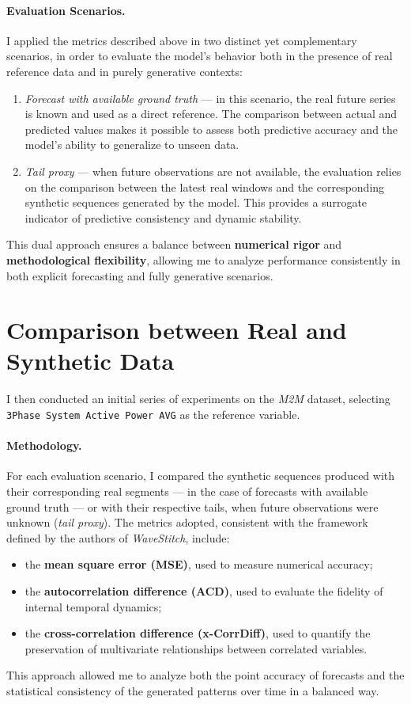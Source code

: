 \paragraph{Evaluation Scenarios.}
I applied the metrics described above in two distinct yet complementary scenarios, in order to evaluate the model’s behavior both in the presence of real reference data and in purely generative contexts:

\begin{enumerate}
  \item \emph{Forecast with available ground truth} — in this scenario, the real future series is known and used as a direct reference. The comparison between actual and predicted values makes it possible to assess both predictive accuracy and the model’s ability to generalize to unseen data.
  
  \item \emph{Tail proxy} — when future observations are not available, the evaluation relies on the comparison between the latest real windows and the corresponding synthetic sequences generated by the model. This provides a surrogate indicator of predictive consistency and dynamic stability.
\end{enumerate}

This dual approach ensures a balance between \textbf{numerical rigor} and \textbf{methodological flexibility}, allowing me to analyze performance consistently in both explicit forecasting and fully generative scenarios.


\section{Comparison between Real and Synthetic Data}

I then conducted an initial series of experiments on the \emph{M2M} dataset, selecting \texttt{3Phase System Active Power AVG} as the reference variable.

\paragraph{Methodology.}
For each evaluation scenario, I compared the synthetic sequences produced with their corresponding real segments — in the case of forecasts with available ground truth — or with their respective tails, when future observations were unknown (\emph{tail proxy}).  
The metrics adopted, consistent with the framework defined by the authors of \emph{WaveStitch}, include:
\begin{itemize}
  \item the \textbf{mean square error (MSE)}, used to measure numerical accuracy;
  \item the \textbf{autocorrelation difference (ACD)}, used to evaluate the fidelity of internal temporal dynamics;
  \item the \textbf{cross-correlation difference (x-CorrDiff)}, used to quantify the preservation of multivariate relationships between correlated variables.
\end{itemize}
This approach allowed me to analyze both the point accuracy of forecasts and the statistical consistency of the generated patterns over time in a balanced way.

